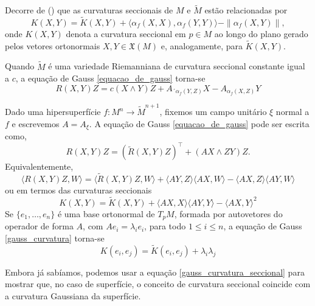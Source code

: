 Decorre de () que as curvaturas seccionais de $M$ e $\tilde{M}$ estão relacionadas por
\begin{equation*}
	K(X,Y) = \tilde{K}(X,Y) + \langle \alpha_f(X,X), \alpha_f(Y,Y) \rangle - \| \alpha_f(X,Y) \|,
\end{equation*}
onde $K(X,Y)$ denota a curvatura seccional em $p \in M$ ao longo do plano gerado pelos vetores ortonormais $X,Y \in \mathfrak{X}(M)$ e, analogamente, para $\tilde{K}(X,Y)$.

\begin{observacao}
	Quando $\tilde{M}$ é uma variedade Riemanniana de curvatura seccional constante igual a $c$, a equação de Gauss \eqref{equacao_de_gauss} torna-se
	\begin{equation*}
		R(X,Y)Z = c(X \wedge Y)Z + A_{´\alpha_f(Y,Z)} X - A_{\alpha_f(X,Z)} Y
	\end{equation*}
\end{observacao}

\begin{observacao}
	Dado uma hipersuperfície $f: M^n \rightarrow \tilde{M}^{n+1}$, fixemos um campo unitário $\xi$ normal a $f$ e escrevemos $A = A_\xi$. A equação de Gauss \eqref{equacao_de_gauss} pode ser escrita como,
	\begin{equation}\label{hipersuperficie_equacao_gauss}
		R(X,Y)Z = (\tilde{R}(X,Y)Z)^\top + (AX \wedge ZY)Z.
	\end{equation}
	Equivalentemente,
	\begin{equation*}
		\langle R(X,Y)Z,W \rangle = \langle \tilde{R}(X,Y)Z,W \rangle + \langle AY,Z \rangle \langle AX,W \rangle - \langle AX,Z \rangle \langle AY,W \rangle
	\end{equation*}
	ou em termos das curvaturas seccionais
	\begin{equation}\label{gauss_curvatura}
		K(X,Y) = \tilde{K}(X,Y) + \langle AX,X \rangle \langle AY,Y \rangle - \langle AX,Y \rangle^2
	\end{equation}
	Se $\{ e_1, \ldots, e_n \}$ é uma base ortonormal de $T_p M$, formada por autovetores do operador de forma $A$, com $Ae_i = \lambda_i e_i$, para todo $1 \leq i \leq n$, a equação de Gauss \eqref{gauss_curvatura} torna-se
	\begin{equation}\label{gauss_curvatura_seccional}
		K(e_i,e_j) = \tilde{K}(e_i,e_j) + \lambda_i \lambda_j
	\end{equation}
\end{observacao}

Embora já sabíamos, podemos usar a equação \eqref{gauss_curvatura_seccional} para mostrar que, no caso de superfície, o conceito de curvatura seccional coincide com a curvatura Gaussiana da superfície.


